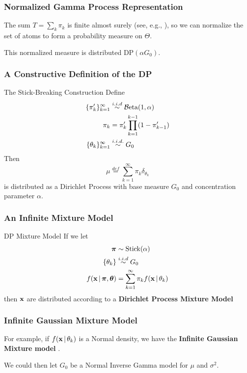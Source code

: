 \documentclass[11pt, serif, mathserif, table,trans]{beamer}
\begin{document}
\begin{frame}
  \frametitle{Normalized Gamma Process Representation}
  
  The sum $T = \sum_{k} \pi_k$ is finite almost surely (see, e.g., \cite{ferguson1973bayesian}), so we can
  normalize the set of atoms to form a probability measure on $\Theta$.

  This normalized measure is distributed $\mathrm{DP}(\alpha G_0)$.
\end{frame}

\begin{frame}
  \frametitle{A Constructive Definition of the DP}
  \begin{infoblock}{The Stick-Breaking Construction \cite{sethuraman1991constructive}}
    Define 
    \begin{align}
      \{\pi'_k\}_{k=1}^{\infty} &\stackrel{i.i.d}{\sim} \mathcal{B}\mathrm{eta}(1,\alpha)
      \\
      \pi_k &= \pi'_k \prod_{k=1}^{k-1} (1 - \pi'_{k-1}) \\
      \{\theta_k\}_{k=1}^{\infty} &\stackrel{i.i.d.}{\sim} G_0
    \end{align}
    Then
    \begin{equation}
      \label{eq:7}
      \mu \stackrel{def}{=} \sum_{k=1}^{\infty} \pi_k \delta_{\theta_k}
    \end{equation}
    is distributed as a Dirichlet Process with base measure $G_0$ and
    concentration parameter $\alpha$.
\end{infoblock}
\end{frame}

\begin{frame}
  \frametitle{An Infinite Mixture Model}
  \begin{infoblock}{DP Mixture Model}
  If we let
  \begin{align}
    \label{eq:10}
    \boldsymbol{\pi} &\sim \mathrm{Stick}(\alpha) \\
    \{\theta_k\} &\stackrel{i.i.d}{\sim} G_0 \\
    f(\mathbf{x} \, \vert \, \boldsymbol{\pi}, \boldsymbol{\theta}) &= \sum_{k=1}^\infty \pi_k f(\mathbf{x} \, \vert \,
    \theta_k)
  \end{align}
  then $\mathbf{x}$ are distributed according to a {\bf Dirichlet Process
    Mixture Model}
\end{infoblock}
\end{frame}

\begin{frame}
  \frametitle{Infinite Gaussian Mixture Model}
  For example, if $f(\mathbf{x} \, \vert \, \theta_k)$ is a Normal density, we
  have the {\bf Infinite Gaussian Mixture model}
  \cite{rasmussen2000infinite}.

  \vspace{0.2in}

   We could then let $G_0$ be a Normal Inverse Gamma model for $\mu$
   and $\sigma^2$.
\end{frame}
\end{document}
